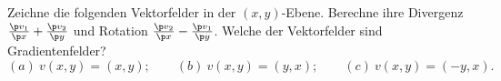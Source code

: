 \begin{prob}
Zeichne die folgenden Vektorfelder in der $(x,y)$-Ebene. Berechne ihre
Divergenz $\frac{\p v_1}{\p x}+\frac{\p v_2}{\p y}$ und Rotation
$\frac{\p v_2}{\p x}-\frac{\p v_1}{\p y}$. Welche der Vektorfelder
sind Gradientenfelder?
$$
(a)\ v(x,y) = (x,y);\qquad
(b)\ v(x,y) = (y,x);\qquad
(c)\ v(x,y) = (-y,x).
$$ 
\end{prob}
